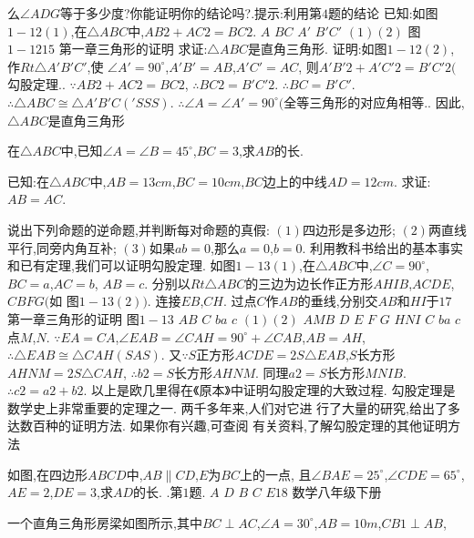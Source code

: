 \documentclass[cn,blue,12pt]{elegantbook}
\begin{document}
\begin{liti}[resume]
么\( \angle  ADG \)等于多少度?你能证明你的结论吗?.提示:利用第\( 4 \)题的结论
已知:如图\( 1-12( 1)\),在\( \triangle ABC \)中,\( AB2 + AC2 = BC2\). 
\(A\)
\(B C\)
\(A′\)
\(B′ C′\)
\(( 1) ( 2)\)
图\( 1-1215\)
第一章\(  \)三角形的证明
求证:\( \triangle ABC \)是直角三角形. 
证明:如图\( 1-12( 2)\),作\( Rt \triangle A′B′C′\),使
\(    \angle  A′ = 90 ^\circ \),\( A′B′ = AB\),\( A′C′ = AC\),
则\( A′B′2 + A′C′2 = B′C′2( \)勾股定理.. 
\( \because AB2 + AC2 = BC2\),
\( \therefore BC2 = B′C′2\). 
\( \therefore BC = B′C′\). 
\( \therefore \triangle ABC \cong  \triangle A′B′C(′ SSS) \). 
\( \therefore \angle  A = \angle A′ = 90 ^\circ ( \)全等三角形的对应角相等.. 
因此,\( \triangle ABC \)是直角三角形
\item 在\( \triangle ABC \)中,已知\( \angle A = \angle B = 45 ^\circ \),\( BC = 3\),求\( AB \)的长. 
\item 已知:在\( \triangle ABC \)中,\( AB = 13 cm\),\( BC = 10 cm\),\( BC \)边上的中线\( AD = 12 cm\). 
求证:\( AB = AC\). 
\item 说出下列命题的逆命题,并判断每对命题的真假:
\(( 1) \)四边形是多边形;
\(( 2) \)两直线平行,同旁内角互补;
\(( 3) \)如果\( ab = 0\),那么\( a = 0\),\( b = 0\). 
利用教科书给出的基本事实和已有定理,我们可以证明勾股定理. 
如图\( 1-13( 1)\),在\( \triangle ABC \)中,\( \angle  C = 90 ^\circ \),\( BC = a\),\( AC = b\),
\(AB = c\). 
分别以\( Rt \triangle ABC \)的三边为边长作正方形\( AHIB\),\( ACDE\),\( CBFG( \)如
图\( 1-13( 2) ) \). 连接\( EB\),\( CH\). 过点\( C \)作\( AB \)的垂线,分别交\( AB \)和\( HI \)于\(17\)
第一章\(  \)三角形的证明
图\( 1-13\)
\(A B\)
\(C\)
\(b a\)
\(c\)
\(( 1) ( 2)\)
\(A M B\)
\(D\)
\(E\)
\(F\)
\(G\)
\(H N I\)
\(C\)
\(b a\)
\(c\)
点\( M\),\( N\). 
\( \because EA = CA\),\( \angle EAB = \angle CAH = 90 ^\circ + \angle CAB\),\( AB = AH\),
\( \therefore \triangle EAB \cong   \triangle CAH (SAS )\). 
又\( \because S\)正方形\(ACDE = 2S \triangle EAB\),\( S\)长方形\(AHNM = 2S \triangle CAH\),
\( \therefore b2 = S\)长方形\(AHNM \). 
同理\( a2 = S\)长方形\(MNIB \). 
\( \therefore c2 = a2 + b2\). 
以上是欧几里得在\(《 \)原本\(》 \)中证明勾股定理的大致过程. 
勾股定理是数学史上非常重要的定理之一. 两千多年来,人们对它进
行了大量的研究,给出了多达数百种的证明方法. 如果你有兴趣,可查阅
有关资料,了解勾股定理的其他证明方法
\item 如图,在四边形\( ABCD \)中,\( AB \parallel CD\),\( E \)为\( BC \)上的一点,
且\( \angle BAE = 25 ^\circ \),\( \angle CDE = 65 ^\circ \),\( AE = 2\),\( DE = 3\),求\( AD \)的长. 
.第\( 1 \)题.
\(A\)
\(D\)
\(B\)
\(C\)
\(E18\)
数学\(  \)八年级\(  \)下册
\item 一个直角三角形房梁如图所示,其中\( BC \perp AC\),\( \angle A = 30 ^\circ \),\( AB = 10 m\),\( CB1 \perp AB\),

\end{liti}
\end{document}
